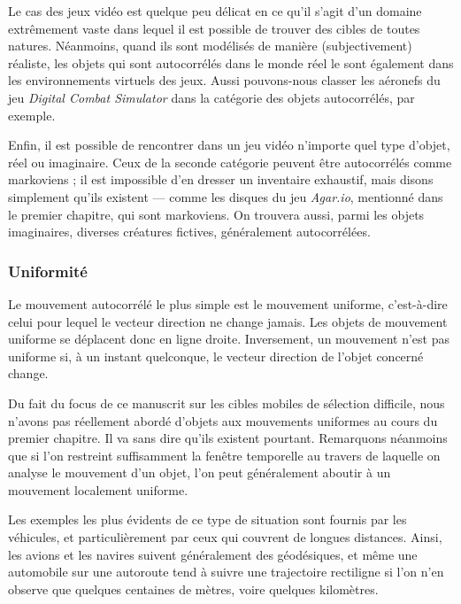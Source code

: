 	Le cas des jeux vidéo est quelque peu délicat en ce qu'il s'agit d'un domaine extrêmement vaste dans lequel il est possible de trouver des cibles de toutes natures. Néanmoins, quand ils sont modélisés de manière (subjectivement) réaliste, les objets qui sont autocorrélés dans le monde réel le sont également dans les environnements virtuels des jeux. Aussi pouvons-nous classer les aéronefs du jeu \emph{Digital Combat Simulator}\footnotemark{} dans la catégorie des objets autocorrélés, par exemple.
	
	
	Enfin, il est possible de rencontrer dans un jeu vidéo n'importe quel type d'objet, réel ou imaginaire. Ceux de la seconde catégorie peuvent être autocorrélés comme markoviens ; il est impossible d'en dresser un inventaire exhaustif, mais disons simplement qu'ils existent --- comme les disques du jeu \emph{Agar.io}, mentionné dans le premier chapitre, qui sont markoviens. On trouvera aussi, parmi les objets imaginaires, diverses créatures fictives, généralement autocorrélées.

	\subsubsection{Uniformité}
	Le mouvement autocorrélé le plus simple est le mouvement uniforme, c'est-à-dire celui pour lequel le vecteur direction ne change jamais. Les objets de mouvement uniforme se déplacent donc en ligne droite. Inversement, un mouvement n'est pas uniforme si, à un instant quelconque, le vecteur direction de l'objet concerné change.
	
	Du fait du focus de ce manuscrit sur les cibles mobiles de sélection difficile, nous n'avons pas réellement abordé d'objets aux mouvements uniformes au cours du premier chapitre. Il va sans dire qu'ils existent pourtant. Remarquons néanmoins que si l'on restreint suffisamment la fenêtre temporelle au travers de laquelle on analyse le mouvement d'un objet, l'on peut généralement aboutir à un mouvement localement uniforme.
	
	Les exemples les plus évidents de ce type de situation sont fournis par les véhicules, et particulièrement par ceux qui couvrent de longues distances. Ainsi, les avions et les navires suivent généralement des géodésiques\footnotemark{}, et même une automobile sur une autoroute tend à suivre une trajectoire rectiligne si l'on n'en observe que quelques centaines de mètres, voire quelques kilomètres.
	
